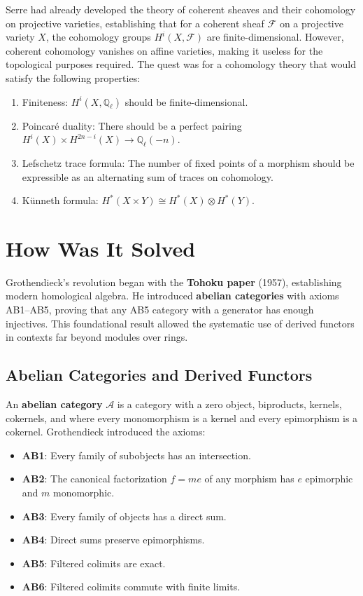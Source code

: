 Serre had already developed the theory of coherent sheaves and their cohomology
on projective varieties, establishing that for a coherent sheaf $\mathcal{F}$ on
a projective variety $X$, the cohomology groups $H^i(X, \mathcal{F})$ are
finite-dimensional. However, coherent cohomology vanishes on affine varieties,
making it useless for the topological purposes required. The quest was for a
cohomology theory that would satisfy the following properties:

\begin{enumerate}
\item Finiteness: $H^i(X, \mathbb{Q}_\ell)$ should be finite-dimensional.
\item Poincaré duality: There should be a perfect pairing
$H^i(X) \times H^{2n-i}(X) \to \mathbb{Q}_\ell(-n)$.
\item Lefschetz trace formula: The number of fixed points of a morphism
should be expressible as an alternating sum of traces on cohomology.
\item Künneth formula: $H^*(X \times Y) \cong H^*(X) \otimes H^*(Y)$.
\end{enumerate}

\section{How Was It Solved}

Grothendieck's revolution began with the \textbf{Tohoku paper} (1957),
establishing modern homological algebra. He introduced \textbf{abelian
categories} with axioms AB1--AB5, proving that any AB5 category with a generator
has enough injectives. This foundational result allowed the systematic use of
derived functors in contexts far beyond modules over rings.

\subsection*{Abelian Categories and Derived Functors}

An \textbf{abelian category} $\mathcal{A}$ is a category with a zero object,
biproducts, kernels, cokernels, and where every monomorphism is a kernel and
every epimorphism is a cokernel. Grothendieck introduced the axioms:

\begin{itemize}
\item \textbf{AB1}: Every family of subobjects has an intersection.
\item \textbf{AB2}: The canonical factorization $f = me$ of any morphism has
$e$ epimorphic and $m$ monomorphic.
\item \textbf{AB3}: Every family of objects has a direct sum.
\item \textbf{AB4}: Direct sums preserve epimorphisms.
\item \textbf{AB5}: Filtered colimits are exact.
\item \textbf{AB6}: Filtered colimits commute with finite limits.
\end{itemize}

